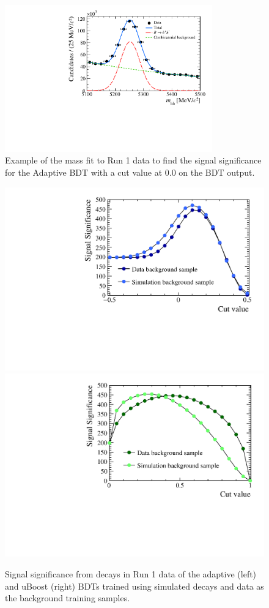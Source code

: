 \begin{figure}[htbp]
    \centering
        \includegraphics[width=0.8\textwidth]{./Figs/Selection/mass_example.pdf}
    \caption{Example of the mass fit to \bhh Run 1 data to find the signal significance for the Adaptive BDT with a cut value at 0.0 on the BDT output. }
    \label{fig:massEG}
\end{figure}

\begin{figure}[htbp]
    \centering
        \includegraphics[width=0.49 \textwidth]{./Figs/Selection/BDT_data_MC_comp.pdf}
       \includegraphics[width=0.49 \textwidth]{./Figs/Selection/uBoost_data_MC_comp.pdf}
    \caption{Signal significance from \bhh decays in Run 1 data of the adaptive (left) and uBoost (right) BDTs trained using simulated decays and data as the background training samples.}
    \label{fig:SSelBDTs}
\end{figure}

